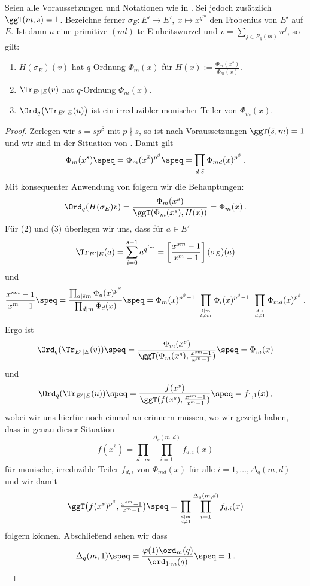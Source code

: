 \begin{satz}
  \label{satz:q_ordnung_von_trace}
  Seien alle Voraussetzungen und Notationen wie in 
  .
  Sei jedoch zusätzlich $\ggT(m,s) = 1$.
  Bezeichne ferner 
  $\sigma_E: E'\to E',\ x \mapsto x^{q^m}$ den Frobenius von $E'$ auf $E$.
  Ist dann $u$ eine primitive $(ml)$-te Einheitswurzel
  und $v = \sum_{j\in R_q(m)} u^j$, so gilt:
  \begin{enumerate}
    \item $H(\sigma_E)(v)$ hat $q$-Ordnung $\Phi_m(x)$ für 
      $H(x) := \frac{\Phi_m(x^s)}{\Phi_m(x)}$.
    \item $\Tr_{E'\mid E}(v)$ hat $q$-Ordnung $\Phi_m(x)$.
    \item $\Ord_q\big(\Tr_{E'\mid E}(u)\big)$ ist ein irreduzibler 
      monischer Teiler von $\Phi_m(x)$.
  \end{enumerate}
\end{satz}
\begin{proof}
  Zerlegen wir $s = \bar s p^\beta$ mit $p\nmid \bar s$, so ist 
  nach Voraussetzungen $\ggT(\bar s, m) = 1$ und wir sind in der Situation von
  . Damit gilt
  \[ \Phi_m(x^s) \speq= \Phi_m(x^{\bar s})^{p^\beta}
    \speq= \prod_{d \mid \bar s} \Phi_{md}(x)^{p^\beta}\,.\]
  Mit konsequenter Anwendung von 
  folgern wir die Behauptungen:
  \[ \Ord_q(H(\sigma_E)v) = \frac{\Phi_m(x^s)}{\ggT(\Phi_m(x^s), H(x))}
    = \Phi_m(x)\,.\]
  Für (2) und (3) überlegen wir uns, dass für $a \in E'$
  \[ \Tr_{E'\mid E}(a) = \sum_{i=0}^{s-1} a^{q^{im}} = 
    \left[\frac{x^{sm}-1}{x^m-1}\right](\sigma_E)(a)\]
  und 
  \[ \frac{x^{sm} -1}{x^m-1} \speq= 
    \frac{ \prod_{d\mid \bar sm} \Phi_d(x)^{p^\beta}}{
      \prod_{d\mid m} \Phi_d(x)} \speq=
    \Phi_m(x)^{p^\beta-1}\ 
    \prod_{l\mid m\atop l\neq m} \Phi_l(x)^{p^\beta-1}\ 
    \prod_{d\mid \bar s\atop d\neq 1} \Phi_{md}(x)^{p^\beta} \,.\]
  Ergo ist
  \[ \Ord_q(\Tr_{E'\mid E}(v)) \speq= 
    \frac{\Phi_m(x^s)}{\ggT(\Phi_m(x^s), \frac{x^{sm}-1}{x^m-1})}
    \speq= \Phi_m(x)\]
  und
  \[ \Ord_q(\Tr_{E'\mid E}(u)) \speq= 
    \frac{f(x^s)}{\ggT(f(x^s), \frac{x^{sm}-1}{x^m-1})} \speq= f_{1,1}(x) \,,\]
  wobei wir uns hierfür noch einmal an 
  erinnern müssen, wo wir gezeigt haben, dass in genau dieser Situation 
  \[ f(x^{\bar s}) = \prod_{d\mid m} \prod_{i=1}^{\Delta_q(m,d)} f_{d,i}(x) \]
  für monische, irreduzible Teiler $f_{d,i}$ von $\Phi_{md}(x)$ für alle 
  $i=1,\ldots,\Delta_q(m,d)$ und wir damit 
  \[ \ggT\big(f(x^{\bar s})^{p^\beta}, \tfrac{x^{sm}-1}{x^m-1}\big) \speq=
    \prod_{d\mid m\atop d \neq 1} \prod_{i=1}^{\Delta_q(m,d)} f_{d,i}(x) \]
  folgern können. Abschließend sehen wir dass
  \[ \Delta_q(m,1) \speq= \frac{\varphi(1) \ord_m(q)}{\ord_{1\cdot m}(q)}
    \speq= 1\,.\]
\end{proof}


